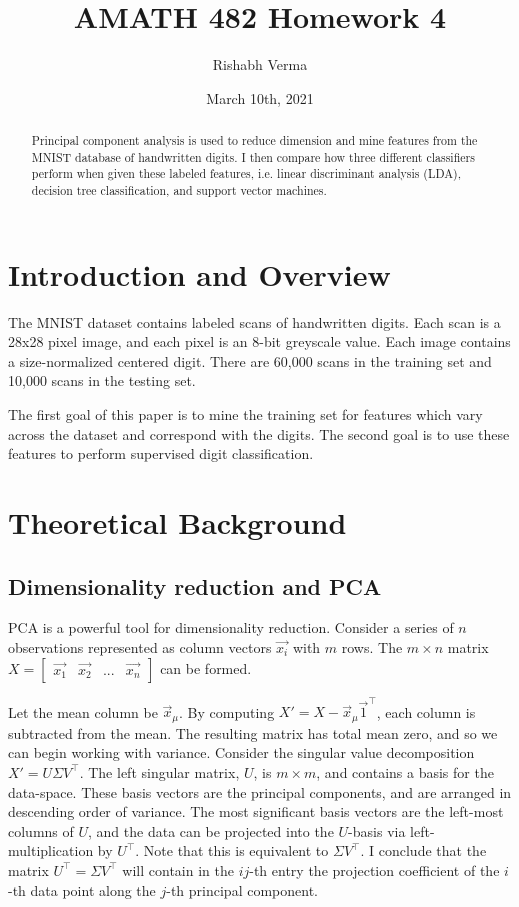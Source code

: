 \documentclass{article}
\title{AMATH 482 Homework 4}
\author{Rishabh Verma}
\date{March 10th, 2021}
\begin{document}
\maketitle

\begin{abstract}
	Principal component analysis is used to reduce dimension and mine features from the MNIST database of handwritten digits. I then compare how three different classifiers perform when given these labeled features, i.e. linear discriminant analysis (LDA), decision tree classification, and support vector machines. %
\end{abstract}

\section{Introduction and Overview}
The MNIST dataset contains labeled scans of handwritten digits. Each scan is a 28x28 pixel image, and each pixel is an 8-bit greyscale value. Each image contains a size-normalized centered digit. There are 60,000 scans in the training set and 10,000 scans in the testing set.

The first goal of this paper is to mine the training set for features which vary across the dataset and correspond with the digits. The second goal is to use these features to perform supervised digit classification. 

\section{Theoretical Background}
\subsection{Dimensionality reduction and PCA}
PCA is a powerful tool for dimensionality reduction. Consider a series of $n$ observations represented as column vectors $\vec{x_i}$ with $m$ rows. The $m \times n$ matrix $X = \begin{bmatrix}
	\vec{x_1} & \vec{x_2} & ... & \vec{x_n}
\end{bmatrix}$ can be formed. 

Let the mean column be $\vec{x}_\mu$. By computing $X' = X - \vec{x}_\mu \vec{1}^\top$, each column is subtracted from the mean. The resulting matrix has total mean zero, and so we can begin working with variance. Consider the singular value decomposition $X' = U \Sigma V^\top$. The left singular matrix, $U$, is $m \times m$, and contains a basis for the data-space. These basis vectors are the principal components, and are arranged in descending order of variance. The most significant basis vectors are the left-most columns of $U$, and the data can be projected into the $U$-basis via left-multiplication by $U^\top$. Note that this is equivalent to $\Sigma V^\top$. I conclude that the matrix $U^\top=\Sigma V^\top$ will contain in the $ij$-th entry the projection coefficient of the $i$-th data point along the $j$-th principal component.
\end{document}
